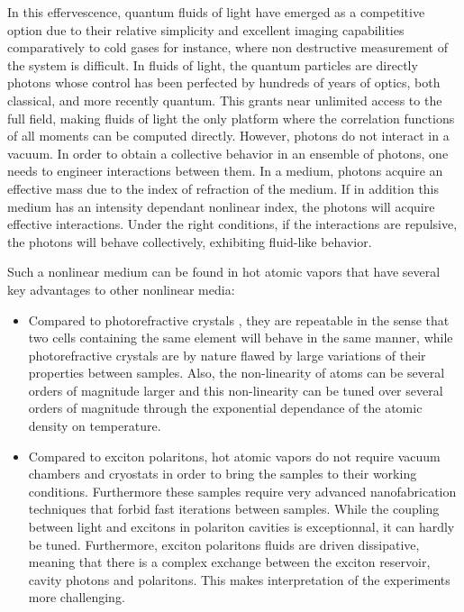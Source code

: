 In this effervescence, quantum fluids of light
have emerged as a competitive option due to their relative simplicity and excellent 
imaging capabilities comparatively to cold gases for instance, where non destructive measurement of 
the system is difficult.
In fluids of light, the quantum particles are directly photons whose control has been 
perfected by hundreds of years of optics, both classical, and more recently quantum.
This grants near unlimited access to the full field, making fluids of light the only 
platform where the correlation functions of all moments can be computed directly.
However, photons do not interact in a vacuum.
In order to obtain a collective behavior in an ensemble of photons, one needs to engineer
interactions between them.
In a medium, photons acquire an effective mass due to the index of refraction of the 
medium.
If in addition this medium has an intensity dependant nonlinear index, the 
photons will acquire effective interactions.
Under the right conditions, if the interactions are repulsive, the photons will behave
collectively, exhibiting fluid-like behavior.

Such a nonlinear medium can be found in hot atomic vapors that have several key advantages
to other nonlinear media:
\begin{itemize}
    \item Compared to photorefractive crystals \cite{michel_superfluid_2018,michel_phonon_2016}, 
    they are repeatable in the sense that two cells 
    containing the same element will behave in the same manner, while photorefractive
    crystals are by nature flawed by large variations of their properties between samples.
    Also, the non-linearity of atoms can be several orders of magnitude larger and this 
    non-linearity can be tuned over several orders of magnitude through the exponential
    dependance of the atomic density on temperature.

    \item Compared to exciton polaritons, hot atomic vapors do not require vacuum chambers and 
    cryostats in order to bring the samples to their working conditions. 
    Furthermore these samples require very advanced nanofabrication techniques that 
    forbid fast iterations between samples.
    While the coupling between light and excitons in polariton cavities is exceptionnal, 
    it can hardly be tuned.
    Furthermore, exciton polaritons fluids are driven dissipative, meaning that there is 
    a complex exchange between the exciton reservoir, cavity photons and polaritons.
    This makes interpretation of the experiments more challenging.
\end{itemize}

